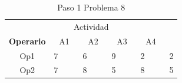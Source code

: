 \documentclass[12pt]{article}  %
\begin{document}
\begin{table}[H]
\centering
\caption{Paso 1 Problema 8}
\label{tab:Paso1Prob8}
\begin{tabular}{ccllcllcllcllc}
\multicolumn{14}{c}{Actividad}                                                                                                                                                                                                                                                                                                                                                                                                                                                                                                                                                                                                                                         \\ \cline{2-13}
\multicolumn{1}{c|}{\textbf{Operario}} & \multicolumn{3}{c|}{A1}                                                                                                                        & \multicolumn{3}{c|}{A2}                                                                                                                        & \multicolumn{3}{c|}{A3}                                                                                                                        & \multicolumn{3}{c|}{A4}                                                                                                                        & \multicolumn{1}{l}{}      \\ \cline{2-13}
\multicolumn{1}{c|}{Op1}               & \multicolumn{1}{c|}{\cellcolor[HTML]{67FD9A}7} & \multicolumn{1}{l|}{\cellcolor[HTML]{FFCC67}} & \multicolumn{1}{l|}{\cellcolor[HTML]{FCFF2F}} & \multicolumn{1}{c|}{\cellcolor[HTML]{67FD9A}6} & \multicolumn{1}{l|}{\cellcolor[HTML]{FFCC67}} & \multicolumn{1}{l|}{\cellcolor[HTML]{F8FF00}} & \multicolumn{1}{c|}{\cellcolor[HTML]{67FD9A}9} & \multicolumn{1}{l|}{\cellcolor[HTML]{FFCC67}} & \multicolumn{1}{l|}{\cellcolor[HTML]{F8FF00}} & \multicolumn{1}{c|}{\cellcolor[HTML]{67FD9A}2} & \multicolumn{1}{l|}{\cellcolor[HTML]{FFC702}} & \multicolumn{1}{l|}{\cellcolor[HTML]{F8FF00}} & \cellcolor[HTML]{FFCCC9}2 \\ \cline{2-13}
\multicolumn{1}{c|}{Op2}               & \multicolumn{1}{c|}{\cellcolor[HTML]{67FD9A}7} & \multicolumn{1}{l|}{\cellcolor[HTML]{FFCC67}} & \multicolumn{1}{l|}{\cellcolor[HTML]{FCFF2F}} & \multicolumn{1}{c|}{\cellcolor[HTML]{67FD9A}8} & \multicolumn{1}{l|}{\cellcolor[HTML]{FFCC67}} & \multicolumn{1}{l|}{\cellcolor[HTML]{F8FF00}} & \multicolumn{1}{c|}{\cellcolor[HTML]{67FD9A}5} & \multicolumn{1}{l|}{\cellcolor[HTML]{FFCC67}} & \multicolumn{1}{l|}{\cellcolor[HTML]{F8FF00}} & \multicolumn{1}{c|}{\cellcolor[HTML]{67FD9A}8} & \multicolumn{1}{l|}{\cellcolor[HTML]{FFC702}} & \multicolumn{1}{l|}{\cellcolor[HTML]{F8FF00}} & \cellcolor[HTML]{FFCCC9}5 \\ \cline{2-13}

\end{tabular}
\end{table}
\end{document}
